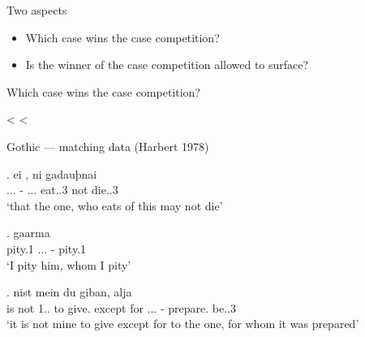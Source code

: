 \documentclass[xcolor=dvipsnames,10pt]{beamer}
\begin{document}
\begin{frame}{Two aspects}

\begin{itemize}
  \item Which case wins the case competition?
  \item Is the winner of the case competition allowed to surface?
\end{itemize}

\end{frame}


\begin{frame}{Which case wins the case competition?}



 <  < 

\end{frame}


\begin{frame}{Gothic --- matching data (Harbert 1978)}

\exg. ei    , ni gadauþnai\\
 ...\textcolor{Turquoise}{} - ... eat..3\textcolor{Turquoise}{\scsub{[nom]}} not die..3\textcolor{Turquoise}{\scsub{[nom]}}\\
`that the one, who eats of this may not die' 



\exg. gaarma   \\
 pity.1\textcolor{LimeGreen}{\scsub{[acc]}} ...\textcolor{LimeGreen}{} - pity.1\textcolor{LimeGreen}{\scsub{[acc]}}\\
 `I pity him, whom I pity' 



\exg. nist mein du giban, alja    \\
{is not} 1.. to give.\textcolor{red}{\scsub{[dat]}} {except for} ...\textcolor{red}{} - prepare. be..3\textcolor{red}{\scsub{[dat]}}\\
`it is not mine to give except for to the one, for whom it was prepared'

\end{frame}
\end{document}
